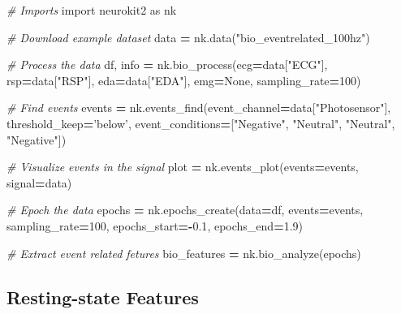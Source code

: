 \documentclass[
  english,
  man,floatsintext]{apa6}
\newenvironment{Shaded}{\begin{snugshade}}{\end{snugshade}}
\newcommand{\CommentTok}[1]{\textcolor[rgb]{0.56,0.35,0.01}{\textit{#1}}}
\newcommand{\DecValTok}[1]{\textcolor[rgb]{0.00,0.00,0.81}{#1}}
\newcommand{\FloatTok}[1]{\textcolor[rgb]{0.00,0.00,0.81}{#1}}
\newcommand{\ImportTok}[1]{#1}
\newcommand{\NormalTok}[1]{#1}
\newcommand{\OperatorTok}[1]{\textcolor[rgb]{0.81,0.36,0.00}{\textbf{#1}}}
\newcommand{\StringTok}[1]{\textcolor[rgb]{0.31,0.60,0.02}{#1}}
\newcommand{\VariableTok}[1]{\textcolor[rgb]{0.00,0.00,0.00}{#1}}
\begin{document}
\begin{Shaded}
\begin{Highlighting}[]
\CommentTok{# Imports}
\ImportTok{import}\NormalTok{ neurokit2 }\ImportTok{as}\NormalTok{ nk}

\CommentTok{# Download example dataset}
\NormalTok{data }\OperatorTok{=}\NormalTok{ nk.data(}\StringTok{"bio_eventrelated_100hz"}\NormalTok{)}

\CommentTok{# Process the data}
\NormalTok{df, info }\OperatorTok{=}\NormalTok{ nk.bio_process(ecg}\OperatorTok{=}\NormalTok{data[}\StringTok{"ECG"}\NormalTok{], rsp}\OperatorTok{=}\NormalTok{data[}\StringTok{"RSP"}\NormalTok{], eda}\OperatorTok{=}\NormalTok{data[}\StringTok{"EDA"}\NormalTok{], emg}\OperatorTok{=}\VariableTok{None}\NormalTok{, sampling_rate}\OperatorTok{=}\DecValTok{100}\NormalTok{)}

\CommentTok{# Find events}
\NormalTok{events }\OperatorTok{=}\NormalTok{ nk.events_find(event_channel}\OperatorTok{=}\NormalTok{data[}\StringTok{"Photosensor"}\NormalTok{], threshold_keep}\OperatorTok{=}\StringTok{'below'}\NormalTok{,}
\NormalTok{                        event_conditions}\OperatorTok{=}\NormalTok{[}\StringTok{"Negative"}\NormalTok{, }\StringTok{"Neutral"}\NormalTok{, }\StringTok{"Neutral"}\NormalTok{, }\StringTok{"Negative"}\NormalTok{])}

\CommentTok{# Visualize events in the signal}
\NormalTok{plot }\OperatorTok{=}\NormalTok{ nk.events_plot(events}\OperatorTok{=}\NormalTok{events, signal}\OperatorTok{=}\NormalTok{data)}

\CommentTok{# Epoch the data}
\NormalTok{epochs }\OperatorTok{=}\NormalTok{ nk.epochs_create(data}\OperatorTok{=}\NormalTok{df, events}\OperatorTok{=}\NormalTok{events, sampling_rate}\OperatorTok{=}\DecValTok{100}\NormalTok{, epochs_start}\OperatorTok{=-}\FloatTok{0.1}\NormalTok{, epochs_end}\OperatorTok{=}\FloatTok{1.9}\NormalTok{)}

\CommentTok{# Extract event related fetures}
\NormalTok{bio_features }\OperatorTok{=}\NormalTok{ nk.bio_analyze(epochs)}
\end{Highlighting}
\end{Shaded}

\hypertarget{resting-state-features}{%
\subsection{Resting-state Features}\label{resting-state-features}}
\end{document}
